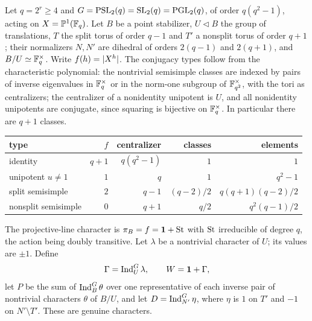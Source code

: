 Let $q=2^r\ge4$ and $G=\operatorname{PSL}_2(q)=\operatorname{SL}_2(q)=\operatorname{PGL}_2(q)$, of order $q(q^2-1)$,
acting on $X=\mathbb P^1(\mathbb{F}_q)$. Let $B$ be a point stabilizer, $U\lhd B$ the
group of translations, $T$ the split torus of order $q-1$ and $T'$ a nonsplit
torus of order $q+1$; their normalizers $N,N'$ are dihedral of orders
$2(q-1)$ and $2(q+1)$, and $B/U\simeq\mathbb{F}_q^\times$. Write $f(h)=\lvert X^h\rvert$. The
conjugacy types follow from the characteristic polynomial: the nontrivial
semisimple classes are indexed by pairs of inverse eigenvalues in $\mathbb{F}_q^\times$
or in the norm-one subgroup of $\mathbb{F}_{q^2}^\times$, with the tori as
centralizers; the centralizer of a nonidentity unipotent is $U$, and all
nonidentity unipotents are conjugate, since squaring is bijective on
$\mathbb{F}_q^\times$. In particular there are $q+1$ classes.
\begin{center}\small
\begin{tabular}{@{}lrrrr@{}}\toprule
type & $f$ & centralizer & classes & elements\\\midrule
identity & $q+1$ & $q(q^2-1)$ & $1$ & $1$\\
unipotent $u\ne1$ & $1$ & $q$ & $1$ & $q^2-1$\\
split semisimple & $2$ & $q-1$ & $(q-2)/2$ & $q(q+1)(q-2)/2$\\
nonsplit semisimple & $0$ & $q+1$ & $q/2$ & $q^2(q-1)/2$\\\bottomrule
\end{tabular}
\end{center}
The projective-line character is $\pi_B=f=\mathbf{1}+\mathrm{St}$ with $\mathrm{St}$
irreducible of degree $q$, the action being doubly transitive. Let $\lambda$
be a nontrivial character of $U$; its values are $\pm1$. Define
\[
 \Gamma=\operatorname{Ind}_U^G\lambda,\qquad W=\mathbf{1}+\Gamma,
\]
let $P$ be the sum of $\operatorname{Ind}_B^G\theta$ over one representative of each inverse
pair of nontrivial characters $\theta$ of $B/U$, and let
$D=\operatorname{Ind}_{N'}^G\eta$, where $\eta$ is $1$ on $T'$ and $-1$ on
$N'\setminus T'$. These are genuine characters.

